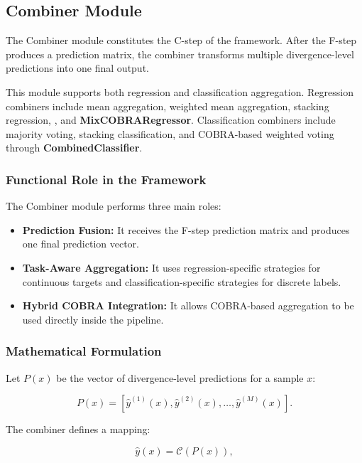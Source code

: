 \subsection{Combiner Module}

\hs The Combiner module constitutes the C-step of the \KFCProcedure{} framework. After the F-step produces a prediction matrix, the combiner transforms multiple divergence-level predictions into one final output.

This module supports both regression and classification aggregation. Regression combiners include mean aggregation, weighted mean aggregation, stacking regression, \GradientCOBRA{}, and \textbf{MixCOBRARegressor}. Classification combiners include majority voting, stacking classification, and COBRA-based weighted voting through \textbf{CombinedClassifier}.


\subsubsection*{Functional Role in the Framework}

The Combiner module performs three main roles:

\begin{itemize}
    \item \textbf{Prediction Fusion:} It receives the F-step prediction matrix and produces one final prediction vector.

    \item \textbf{Task-Aware Aggregation:} It uses regression-specific strategies for continuous targets and classification-specific strategies for discrete labels.

    \item \textbf{Hybrid COBRA Integration:} It allows COBRA-based aggregation to be used directly inside the \KFCProcedure{} pipeline.
\end{itemize}

\subsubsection*{Mathematical Formulation}

Let $P(x)$ be the vector of divergence-level predictions for a sample $x$:

\[
    P(x) = \left[\hat{y}^{(1)}(x), \hat{y}^{(2)}(x), \dots, \hat{y}^{(M)}(x)\right].
\]

The combiner defines a mapping:

\[
    \hat{y}(x) = \mathcal{C}\left(P(x)\right),
\]

